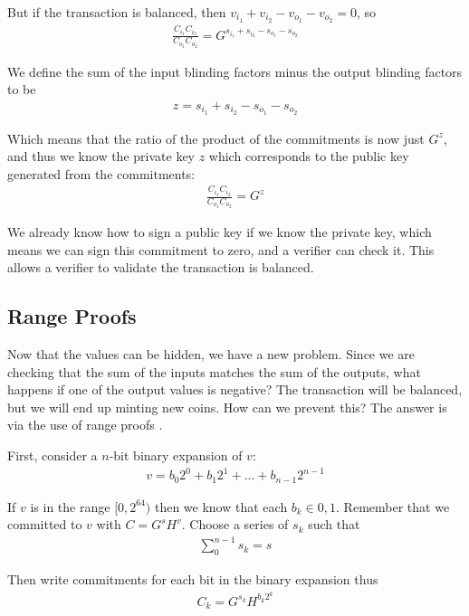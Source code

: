 \documentclass{article}
\begin{document}
But if the transaction is balanced, then $v_{i_1} + v_{i_2} - v_{o_1} - v_{o_2} = 0$, so
\begin{align}
  \frac{C_{i_1} C_{i_2}}{C_{o_1} C_{o_2}} = G^{s_{i_1} + s_{i_2} - s_{o_1} - s_{o_2}}
\end{align}

We define the sum of the input blinding factors minus the output blinding factors to be
\begin{align}
  z = s_{i_1} + s_{i_2} - s_{o_1} - s_{o_2}
\end{align}

Which means that the ratio of the product of the commitments is now just $G^z$, and thus we know the private key $z$ which corresponds to the public key generated from the commitments:
\begin{align}
  \frac{C_{i_1} C_{i_2}}{C_{o_1} C_{o_2}} = G^z
\end{align}

We already know how to sign a public key if we know the private key, which means we can sign this commitment to zero, and a verifier can check it.  This allows a verifier to validate the transaction is balanced.


\subsection{Range Proofs}

Now that the values can be hidden, we have a new problem.  Since we are checking that the sum of the inputs matches the sum of the outputs, what happens if one of the output values is negative?  The transaction will be balanced, but we will end up minting new coins.  How can we prevent this?  The answer is via the use of range proofs \cite{ringct}.

First, consider a $n$-bit binary expansion of $v$:
\begin{align}
  v = b_0 2^0 + b_1 2^1 + ... + b_{n-1} 2^{n-1}
\end{align}

If $v$ is in the range $[0, 2^{64})$ then we know that each $b_k \in {0, 1}$.  Remember that we committed to $v$ with $C = G^s H^v$.  Choose a series of $s_k$ such that
\begin{align}
  \sum_0^{n-1} s_k = s 
\end{align}

Then write commitments for each bit in the binary expansion thus
\begin{align}
  C_k = G^{s_k} H^{b_k 2^k}
\end{align}
\end{document}
